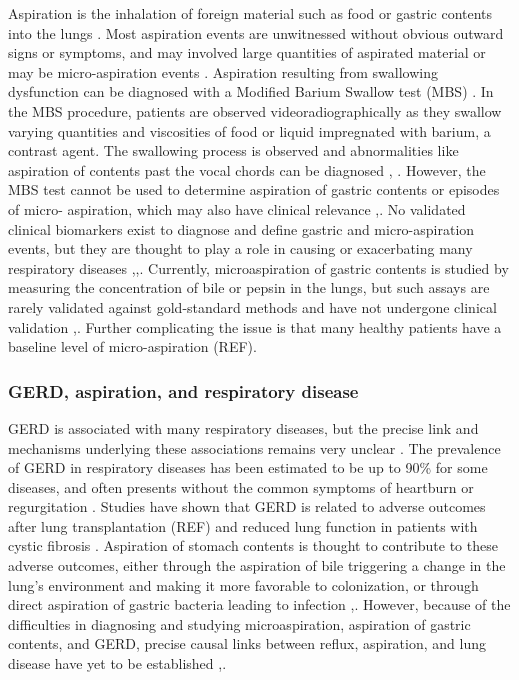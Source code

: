 \documentclass[12pt]{article}
\begin{document}
Aspiration is the inhalation of foreign material such as food or 
gastric contents into the lungs \cite{raghavendran-asp_injury-2011}. 
Most aspiration events are unwitnessed without obvious outward signs 
or symptoms, and may involved large quantities of aspirated material 
or may be micro-aspiration events \cite{raghavendran-asp_injury-2011}. 
Aspiration resulting from swallowing dysfunction can be diagnosed with 
a Modified Barium Swallow test (MBS) \cite{martinharris-mbs-2008}. In 
the MBS procedure, patients are observed videoradiographically as they 
swallow varying quantities and viscosities of food or liquid 
impregnated with barium, a contrast agent. The swallowing process is 
observed and abnormalities like aspiration of contents past the vocal 
chords can be diagnosed \cite{martinharris-clinical_mbs-2000},
\cite{martinharris-mbs-2008}. However, the MBS test cannot be used to 
determine aspiration of gastric contents or episodes of micro-
aspiration, which may also have clinical relevance \cite{raghavendran-
asp_injury-2011},\cite{lee-pulm_asp-2014}. No validated clinical 
biomarkers exist to diagnose and define gastric and micro-aspiration 
events\cite{lee-pulm_asp-2014}, but they are thought to play a role in 
causing or exacerbating many respiratory diseases \cite{reen-
aspirated_bile-2014},\cite{almomani-cf_sputum-2016},\cite{houghton-
microaspiration-2016}. Currently, microaspiration of gastric contents 
is studied by measuring the concentration of bile or pepsin in the 
lungs, but such assays are rarely validated against gold-standard 
methods and have not undergone clinical validation \cite{houghton-
microaspiration-2016},\cite{lee-pulm_asp-2014}. Further complicating 
the issue is that many healthy patients have a baseline level of 
micro-aspiration (REF).

\subsubsection{GERD, aspiration, and respiratory disease}
GERD is associated with many respiratory diseases, but the precise 
link and mechanisms underlying these associations remains very unclear 
\cite{houghton-microaspiration-2016}. The prevalence of GERD in 
respiratory diseases has been estimated to be up to 90\% for some 
diseases, and often presents without the common symptoms of heartburn 
or regurgitation \cite{houghton-microaspiration-2016}. Studies have 
shown that GERD is related to adverse outcomes after lung 
transplantation (REF) and reduced lung function in patients with 
cystic fibrosis \cite{almomani-cf_sputum-2016}. Aspiration of stomach 
contents is thought to contribute to these adverse outcomes, either 
through the aspiration of bile triggering a change in the lung's 
environment and making it more favorable to colonization, or through 
direct aspiration of gastric bacteria leading to infection 
\cite{almomani-cf_sputum-2016},\cite{reen-aspirated_bile-2014}. 
However, because of the difficulties in diagnosing and studying 
microaspiration, aspiration of gastric contents, and GERD, precise 
causal links between reflux, aspiration, and lung disease have yet to 
be established \cite{almomani-cf_sputum-2016},\cite{houghton-
microaspiration-2016}.
\end{document}
